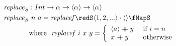 \documentclass[preview]{standalone}
\begin{document}
\begin{align*}
  \mathit{replace}_S &: Int \rightarrow \alpha \rightarrow \vect{\alpha} \rightarrow \vect{\alpha} \\
  \mathit{replace}_S &\ n\ a = \mathit{replacef} \redS \vect{1,2,...} \cdot \vect{} \fMapS\\
         & \text{where}\ \ \mathit{replacef}\ i\ x\ y = 
           \left\{\begin{array}{ll}
                    \vect{a} \fcat y & \text{ if } i = n\\
                    x \fcat y & \text{ otherwise}
                  \end{array}
           \right.\\
\end{align*}
\end{document}
